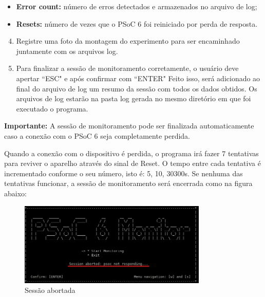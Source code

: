 \documentclass[12pt, a4paper]{article}
\begin{document}
\begin{itemize}[leftmargin=1.3cm]
    \item \textbf{Error count:} número de erros detectados e armazenados no arquivo de log;

    \item \textbf{Resets:} número de vezes que o PSoC 6 foi reiniciado por perda de resposta.
\end{itemize}

\begin{enumerate}[leftmargin=1.3cm]
    \setcounter{enumi}{3}

    \item Registre uma foto da montagem do experimento para ser encaminhado juntamente com os arquivos log.

    \item Para finalizar a sessão de monitoramento corretamente, o usuário deve apertar ``ESC" e após confirmar com ``ENTER"  Feito isso, será adicionado ao final do arquivo de log um resumo da sessão com todos os dados obtidos. Os arquivos de log estarão na pasta log gerada no mesmo diretório em que foi executado o programa.
\end{enumerate}

\textbf{Importante:} A sessão de monitoramento pode ser finalizada automaticamente caso a conexão com o PSoC 6 seja completamente perdida.

Quando a conexão com o dispositivo é perdida, o programa irá fazer 7 tentativas para reviver o aparelho através do sinal de Reset. O tempo entre cada tentativa é incrementado conforme o seu número, isto é: 5, 10, 30300s. Se nenhuma das tentativas funcionar, a sessão de monitoramento será encerrada como na figura abaixo:

\begin{figure}[H]
    \centering
    \caption{Sessão abortada}
    \includegraphics[width=0.8\textwidth]{../imgs/session_aborted.png}

    \vspace{0.5em}
    \label{fig:session_aborted}
\end{figure}
\end{document}
